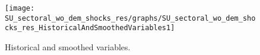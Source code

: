  
\begin{figure}[H]
\centering 
\texttt{[image: SU\_sectoral\_wo\_dem\_shocks\_res/graphs/SU\_sectoral\_wo\_dem\_shocks\_res\_HistoricalAndSmoothedVariables1]}
\caption{Historical and smoothed variables.}\label{Fig:HistoricalAndSmoothedVariables:1}
\end{figure}


